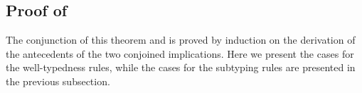 \begin{bycase}

\end{bycase}


\subsection*{Proof of }

The conjunction of this theorem and  is proved by
induction on the derivation of the antecedents of the two conjoined
implications. Here we present the cases for the well-typedness rules, while
the cases for the subtyping rules are presented in the previous subsection.

